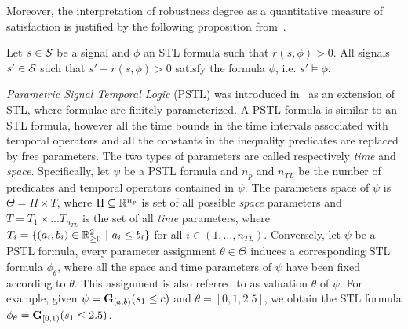 Moreover, the interpretation of robustness degree as a quantitative measure of satisfaction is justified by the following proposition from~\cite{donze_efficient_2013}.
\begin{proposition}
\label{th:robustness-relative}
Let $s \in \mathcal{S}$ be a signal and $\phi$ an STL formula such that $r(s, \phi) > 0$. All signals $s' \in \mathcal{S}$ such that $s' - r(s, \phi) > 0$ satisfy the formula $\phi$, i.e. $s' \models \phi$.
\end{proposition}


{\em Parametric Signal Temporal Logic} (PSTL) was introduced in~\cite{asarin_parametric_2012} as an extension of STL, where formulae are finitely parameterized.
A PSTL formula is similar to an STL formula, however all the time bounds in the time intervals associated with temporal operators and all the constants in the
inequality predicates are replaced by free parameters.
The two types of parameters are called respectively {\em time} and {\em space}.
Specifically, let $\psi$ be a PSTL formula and $n_p$ and $n_{TL}$ be the number of predicates and temporal operators contained in $\psi$. %
The parameters space of $\psi$ is $\Theta = \Pi \times T$, where $\Pi\subseteq\mathbb{R}^{n_p}$ is set of all possible {\em space} parameters
and $T = T_1 \times \ldots T_{n_{TL}}$ is the set of all {\em time} parameters, where $T_i = \{(a_i, b_i) \in \mathbb{R}_{\geq 0}^2 \ |\  a_i \leq b_i  \}$ for all $i \in (1, \dots, n_{TL})$.
Conversely, let $\psi$ be a PSTL formula, every parameter assignment $\theta\in\Theta$ induces a corresponding STL formula $\phi_\theta$, where all the space and time parameters of $\psi$ have been fixed according to $\theta$. This assignment is also referred to as valuation $\theta$ of $\psi$.
For example, given $\psi = \mathbf{G}_{[a ,b)} (s_1 \leq c)$ and $\theta=[0,1,2.5]$, we obtain the STL formula $\phi_\theta = \mathbf{G}_{[0 ,1)} (s_1 \leq 2.5)$.


\begin{comment}%
Let $\psi$ be a PSTL formula and $n_p$ and $n_{TL}$ be the number of  predicates and temporal operators contained in $\phi$, respectively.
The parameters space of $\psi$ is $\Theta = \Pi \times T$, where $\Pi$ is the compact hyper-box in $\BB{R}^{n_p}$ of all possible {\em space} parameters
and $T = T_1 \times \ldots T_{n_{TL}}$ is the set of all {\em time} parameters, $T_i = \{(a_i, b_i) \in \BB{R}^2 \ |\ \tau^L_i \leq a_i \leq b_i \leq \tau^U_i, \tau^L_i \leq \tau^U_i \in \BB{R}_{\geq 0} \}$ for all $i \in \overline{(1, n_{TL})}$.
Let $\psi$ be a PSTL formula. We denote by $\theta$ the full parameterization of $\psi$, i.e. the vector of all space and time parameters.
A {\em valuation} $v$ of $\psi$ is an assignment of values from $\Theta$ to all parameters $\theta$, i.e. $v : \theta \to \Theta$.
Each valuation $v$ of an PSTL formula $\psi$ induces an STL formula $\phi_v$ where the parameters $\theta$ are replaced by their corresponding values $v(\theta)$.
\end{comment}




